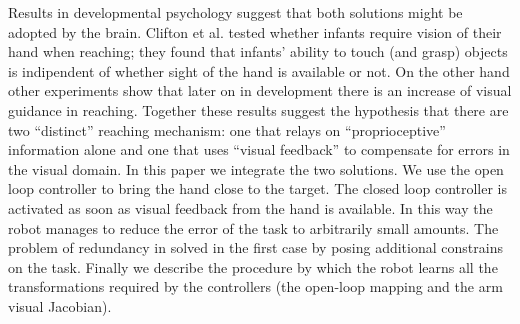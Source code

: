 Results in developmental psychology suggest that both solutions might be
adopted by the brain. Clifton et al. \cite{clifton93isvisually} 
tested whether infants require vision of their hand when reaching; they 
found that infants' ability to touch (and grasp) objects is indipendent 
of whether sight of the hand is available or not. On the other hand 
other experiments \cite{ashmead93visual}
show that later on in development there is an increase of visual guidance 
in reaching. Together these results suggest the hypothesis that there 
are two ``distinct'' reaching mechanism: one that relays on ``proprioceptive'' 
information alone and one that uses ``visual feedback'' to compensate 
for errors in the visual domain.
In this paper we integrate the two solutions. We use the open loop
controller to bring the hand close to the target. The closed loop controller 
is activated as soon as visual feedback from the hand is available. In this
way the robot manages to reduce the error of the task to arbitrarily small 
amounts. The problem of redundancy in solved in the first case by posing 
additional constrains on the task. Finally we describe the procedure by 
which the robot learns all the transformations required by the controllers 
(the open-loop mapping and the arm visual Jacobian).